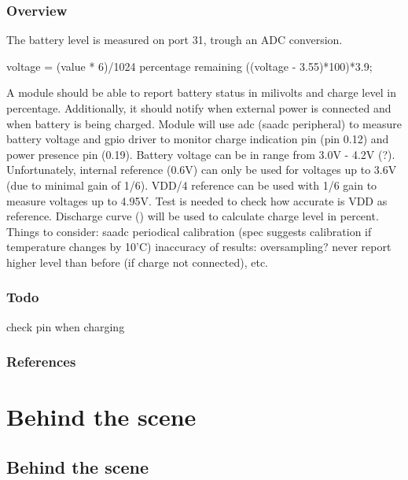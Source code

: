 \documentclass[letterpaper,10pt,english]{sphinxmanual}
\begin{document}
\subsection{Overview}
\label{\detokenize{drivers/battery:overview}}
The battery level is measured on port 31, trough an ADC conversion.

voltage = (value * 6)/1024
percentage remaining  ((voltage - 3.55)*100)*3.9;

A module should be able to report battery status in milivolts and charge level in percentage. Additionally, it should notify when external power is connected and when battery is being charged.
Module will use adc (saadc peripheral) to measure battery voltage and gpio driver to monitor charge indication pin (pin 0.12) and power presence pin (0.19).
Battery voltage can be in range from 3.0V - 4.2V (?). Unfortunately, internal reference (0.6V) can only be used for voltages up to 3.6V (due to minimal gain of 1/6). VDD/4 reference can be used with 1/6 gain to measure voltages up to 4.95V. Test is needed to check how accurate is VDD as reference.
Discharge curve () will be used to calculate charge level in percent.
Things to consider:
saadc periodical calibration (spec suggests calibration if temperature changes by 10’C)
inaccuracy of results: oversampling? never report higher level than before (if charge not connected), etc.


\subsection{Todo}
\label{\detokenize{drivers/battery:todo}}
check pin when charging


\subsection{References}
\label{\detokenize{drivers/battery:references}}


\chapter{Behind the scene}
\label{\detokenize{behind/behind:behind-the-scene}}\label{\detokenize{behind/behind:id1}}\label{\detokenize{behind/behind::doc}}

\section{Behind the scene}
\label{\detokenize{behind/behind-the-scene:behind-the-scene}}\label{\detokenize{behind/behind-the-scene::doc}}
\end{document}
